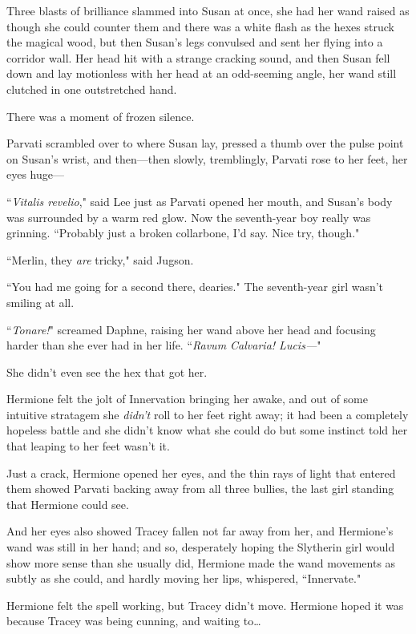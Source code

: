 Three blasts of brilliance slammed into Susan at once, she had her wand raised as though she could counter them and there was a white flash as the hexes struck the magical wood, but then Susan's legs convulsed and sent her flying into a corridor wall. Her head hit with a strange cracking sound, and then Susan fell down and lay motionless with her head at an odd-seeming angle, her wand still clutched in one outstretched hand.

There was a moment of frozen silence.

Parvati scrambled over to where Susan lay, pressed a thumb over the pulse point on Susan's wrist, and then—then slowly, tremblingly, Parvati rose to her feet, her eyes huge—

``\emph{Vitalis revelio}," said Lee just as Parvati opened her mouth, and Susan's body was surrounded by a warm red glow. Now the seventh-year boy really was grinning. ``Probably just a broken collarbone, I'd say. Nice try, though."

``Merlin, they \emph{are} tricky," said Jugson.

``You had me going for a second there, dearies." The seventh-year girl wasn't smiling at all.

``\emph{Tonare!}" screamed Daphne, raising her wand above her head and focusing harder than she ever had in her life. ``\emph{Ravum Calvaria! Lucis—}"

She didn't even see the hex that got her.

\later

Hermione felt the jolt of Innervation bringing her awake, and out of some intuitive stratagem she \emph{didn't} roll to her feet right away; it had been a completely hopeless battle and she didn't know what she could do but some instinct told her that leaping to her feet wasn't it.

Just a crack, Hermione opened her eyes, and the thin rays of light that entered them showed Parvati backing away from all three bullies, the last girl standing that Hermione could see.

And her eyes also showed Tracey fallen not far away from her, and Hermione's wand was still in her hand; and so, desperately hoping the Slytherin girl would show more sense than she usually did, Hermione made the wand movements as subtly as she could, and hardly moving her lips, whispered, ``Innervate."

Hermione felt the spell working, but Tracey didn't move. Hermione hoped it was because Tracey was being cunning, and waiting to{\ldots}

